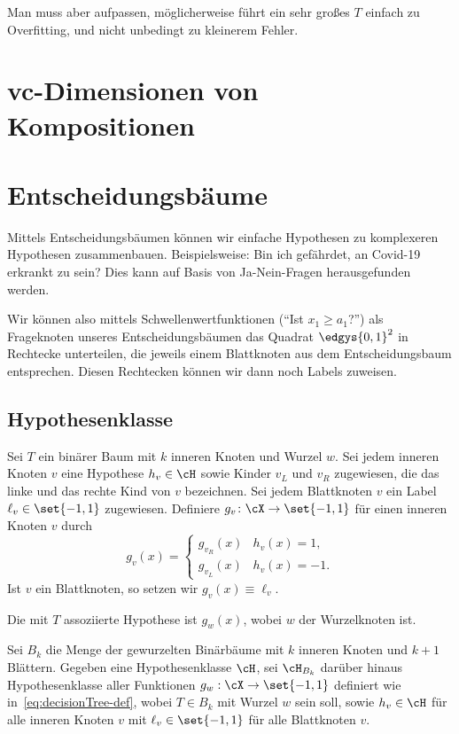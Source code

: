 \documentclass[language=ngerman,algolist,acrolist]{TemplateLecture}
\begin{document}
Man muss aber aufpassen, möglicherweise führt ein sehr großes $T$ einfach zu Overfitting, und nicht unbedingt zu kleinerem Fehler.

\chapter{\acs{vc}-Dimensionen von Kompositionen}\label{chap:vcDimComp}


\chapter{Entscheidungsbäume}
Mittels Entscheidungsbäumen können wir einfache Hypothesen zu komplexeren Hypothesen zusammenbauen. Beispielsweise: Bin ich gefährdet, an Covid-19 erkrankt zu sein? Dies kann auf Basis von Ja-Nein-Fragen herausgefunden werden.

Wir können also mittels Schwellenwertfunktionen (\enquote{Ist $x_1 \geq a_1$?}) als Frageknoten unseres Entscheidungsbäumen das Quadrat $\edgys{0,1}^2$ in Rechtecke unterteilen, die jeweils einem Blattknoten aus dem Entscheidungsbaum entsprechen. Diesen Rechtecken können wir dann noch Labels zuweisen.

\section{Hypothesenklasse}

Sei $T$ ein binärer Baum mit $k$ inneren Knoten und Wurzel $w$. Sei jedem inneren Knoten $v$ eine Hypothese $h_v \in \cH$ sowie Kinder $v_L$ und $v_R$ zugewiesen, die das linke und das rechte Kind von $v$ bezeichnen. Sei jedem Blattknoten $v$ ein Label $\ell_v \in \set{-1, 1}$ zugewiesen. Definiere $g_v \colon \cX \to \set{-1, 1}$ für einen inneren Knoten $v$ durch 
\begin{equation}\label{eq:decisionTree-def}
    g_v(x) = \begin{cases}
        g_{v_R}(x) &  h_v(x) = 1, \\
        g_{v_L}(x) &  h_v(x) = -1.
    \end{cases}
\end{equation}
Ist $v$ ein Blattknoten, so setzen wir $g_v(x) \equiv \ell_v$.

Die mit $T$ assoziierte Hypothese ist $g_w(x)$, wobei $w$ der Wurzelknoten ist.

Sei $B_k$ die Menge der gewurzelten Binärbäume mit $k$ inneren Knoten und $k + 1$ Blättern. Gegeben eine Hypothesenklasse $\cH$, sei $\cH_{B_k}$ darüber hinaus Hypothesenklasse aller Funktionen $g_w: \cX \to \set{-1,1}$ definiert wie in~\eqref{eq:decisionTree-def}, wobei $T \in B_k$ mit Wurzel $w$ sein soll, sowie $h_v \in \cH$ für alle inneren Knoten $v$ mit $\ell_v \in \set{-1, 1}$ für alle Blattknoten $v$.
\end{document}
